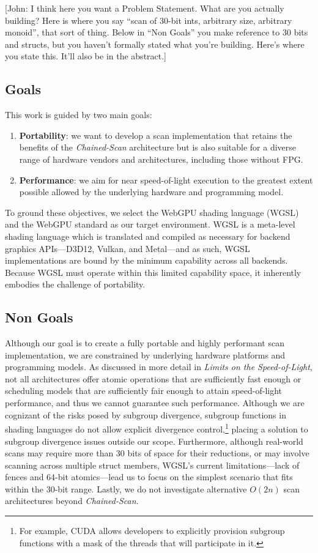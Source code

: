 \documentclass[sigconf]{acmart}
\newcommand{\john}[1]{{\footnotesize\color{cyan}[John: #1]}}
\begin{document}
\john{I think here you want a Problem Statement. What are you actually building? Here is where you say ``scan of 30-bit ints, arbitrary size, arbitrary monoid'', that sort of thing. Below in ``Non Goals'' you make reference to 30 bits and structs, but you haven't formally stated what you're building. Here's where you state this. It'll also be in the abstract.}

\subsection{Goals}
This work is guided by two main goals:

\begin{enumerate}
  \item \textbf{Portability}: we want to develop a scan implementation that retains the benefits of the \emph{Chained-Scan} architecture but is also suitable for a diverse range of hardware vendors and architectures, including those without FPG\@.
  \item \textbf{Performance}: we aim for near speed-of-light execution to the greatest extent possible allowed by the underlying hardware and programming model.
\end{enumerate}

\noindent
To ground these objectives, we select the WebGPU shading language (WGSL) and the WebGPU standard as our target environment. WGSL is a meta-level shading language which is translated and compiled as necessary for backend graphics APIs---D3D12, Vulkan, and Metal---and as such, WGSL implementations are bound by the minimum capability across all backends. Because WGSL must operate within this limited capability space, it inherently embodies the challenge of portability.

\subsection{Non Goals}
Although our goal is to create a fully portable and highly performant scan implementation, we are constrained by underlying hardware platforms and programming models. As discussed in more detail in \emph{Limits on the Speed-of-Light}, not all architectures offer atomic operations that are sufficiently fast enough or scheduling models that are sufficiently fair enough to attain speed-of-light performance, and thus we cannot guarantee such performance. Although we are cognizant of the risks posed by subgroup divergence, subgroup functions in shading languages do not allow explicit divergence control,\footnote{For example, CUDA allows developers to explicitly provision subgroup functions with a mask of the threads that will participate in it.} placing a solution to subgroup divergence issues outside our scope. Furthermore, although real-world scans may require more than 30 bits of space for their reductions, or may involve scanning across multiple struct members, WGSL’s current limitations---lack of fences and 64-bit atomics---lead us to focus on the simplest scenario that fits within the 30-bit range. Lastly, we do not investigate alternative $O(2n)$ scan architectures beyond \emph{Chained-Scan}.
\end{document}
